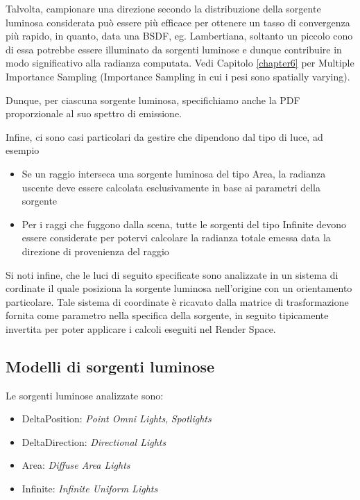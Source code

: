 Talvolta, campionare una direzione secondo la distribuzione della sorgente luminosa considerata pu\`o essere pi\`u efficace per ottenere un tasso di  
convergenza pi\`u rapido, in quanto, data una BSDF, eg. Lambertiana, soltanto un piccolo cono di essa potrebbe essere illuminato da sorgenti 
luminose e dunque contribuire in modo significativo alla radianza computata. Vedi Capitolo \ref{chapter6} per Multiple Importance Sampling 
(Importance Sampling in cui i pesi sono spatially varying).\par
Dunque, per ciascuna sorgente luminosa, specifichiamo anche la PDF proporzionale al suo spettro di emissione.\par
Infine, ci sono casi particolari da gestire che dipendono dal tipo di luce, ad esempio
\begin{itemize}[topsep=0pt,noitemsep]
	\item Se un raggio interseca una sorgente luminosa del tipo Area, la radianza uscente deve essere calcolata esclusivamente in base ai parametri
		della sorgente
	\item Per i raggi che fuggono dalla scena, tutte\footnotemark{} le sorgenti del tipo Infinite devono essere considerate per potervi calcolare 
		la radianza totale emessa data la direzione di provenienza del raggio
\end{itemize}
Si noti infine, che le luci di seguito specificate sono analizzate in un sistema di cordinate il quale posiziona la sorgente luminosa nell'origine
con un orientamento particolare. Tale sistema di coordinate \`e ricavato dalla matrice di trasformazione fornita come parametro nella 
specifica della sorgente, in seguito tipicamente invertita per poter applicare i calcoli eseguiti nel Render Space.\par
\subsection{Modelli di sorgenti luminose}
Le sorgenti luminose analizzate sono: 
\begin{itemize}[topsep=0pt,noitemsep]
	\item DeltaPosition: \textit{Point Omni Lights}, \textit{Spotlights}
	\item DeltaDirection: \textit{Directional Lights}
	\item Area: \textit{Diffuse Area Lights}
	\item Infinite: \textit{Infinite Uniform Lights}
\end{itemize}
